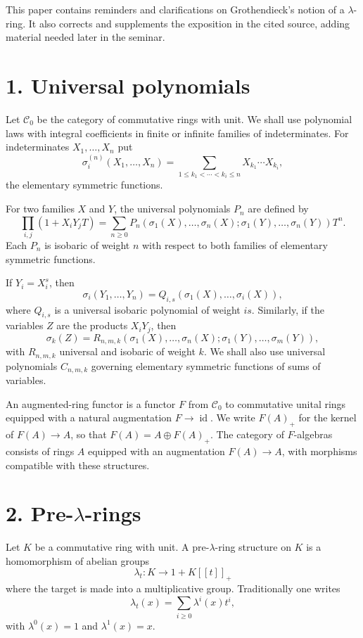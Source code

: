 \documentclass[13pt]{extarticle}
\begin{document}
This paper contains reminders and clarifications on Grothendieck's notion of a $\lambda$-ring. It also corrects and supplements the exposition in the cited source, adding material needed later in the seminar.

\section*{1. Universal polynomials}
Let $\mathcal C_0$ be the category of commutative rings with unit. We shall use polynomial laws with integral coefficients in finite or infinite families of indeterminates. For indeterminates $X_1,\ldots,X_n$ put
\[
\sigma_i^{(n)}(X_1,\ldots,X_n)=
\sum_{1\le k_1<\cdots<k_i\le n}X_{k_1}\cdots X_{k_i},
\]
the elementary symmetric functions.

For two families $X$ and $Y$, the universal polynomials $P_n$ are defined by
\[
\prod_{i,j}(1+X_iY_jT)
=\sum_{n\ge0}P_n(\sigma_1(X),\ldots,\sigma_n(X);\sigma_1(Y),\ldots,\sigma_n(Y))T^n.
\]
Each $P_n$ is isobaric of weight $n$ with respect to both families of elementary symmetric functions.

If $Y_i=X_i^s$, then
\[
\sigma_i(Y_1,\ldots,Y_n)=Q_{i,s}(\sigma_1(X),\ldots,\sigma_i(X)),
\]
where $Q_{i,s}$ is a universal isobaric polynomial of weight $is$. Similarly, if the variables $Z$ are the products $X_iY_j$, then
\[
\sigma_k(Z)=R_{n,m,k}(\sigma_1(X),\ldots,\sigma_n(X);\sigma_1(Y),\ldots,\sigma_m(Y)),
\]
with $R_{n,m,k}$ universal and isobaric of weight $k$. We shall also use universal polynomials $C_{n,m,k}$ governing elementary symmetric functions of sums of variables.

An augmented-ring functor is a functor $F$ from $\mathcal C_0$ to commutative unital rings equipped with a natural augmentation $F\to\operatorname{id}$. We write $F(A)_+$ for the kernel of $F(A)\to A$, so that $F(A)=A\oplus F(A)_+$. The category of $F$-algebras consists of rings $A$ equipped with an augmentation $F(A)\to A$, with morphisms compatible with these structures.

\section*{2. Pre-$\lambda$-rings}
Let $K$ be a commutative ring with unit. A pre-$\lambda$-ring structure on $K$ is a homomorphism of abelian groups
\[
\lambda_t:K\longrightarrow 1+K[[t]]_+
\]
where the target is made into a multiplicative group. Traditionally one writes
\[
\lambda_t(x)=\sum_{i\ge0}\lambda^i(x)t^i,
\]
with $\lambda^0(x)=1$ and $\lambda^1(x)=x$.
\end{document}
